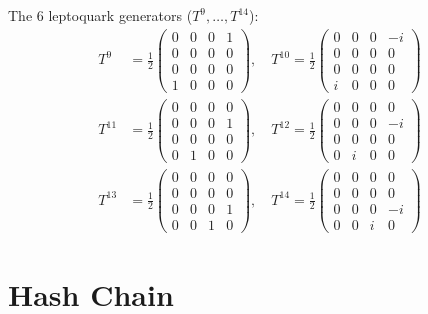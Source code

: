 \documentclass[11pt,a4paper]{article}
\theoremstyle{definition}
\begin{document}
The 6 leptoquark generators ($T^9, \ldots, T^{14}$):
\begin{align}
  \label{eq:leptoquark-9-10}
  T^9 &= \frac{1}{2}\begin{pmatrix} 0&0&0&1\\0&0&0&0\\0&0&0&0\\1&0&0&0 \end{pmatrix}, \quad
  T^{10} = \frac{1}{2}\begin{pmatrix} 0&0&0&-i\\0&0&0&0\\0&0&0&0\\i&0&0&0 \end{pmatrix} \\
  \label{eq:leptoquark-11-12}
  T^{11} &= \frac{1}{2}\begin{pmatrix} 0&0&0&0\\0&0&0&1\\0&0&0&0\\0&1&0&0 \end{pmatrix}, \quad
  T^{12} = \frac{1}{2}\begin{pmatrix} 0&0&0&0\\0&0&0&-i\\0&0&0&0\\0&i&0&0 \end{pmatrix} \\
  \label{eq:leptoquark-13-14}
  T^{13} &= \frac{1}{2}\begin{pmatrix} 0&0&0&0\\0&0&0&0\\0&0&0&1\\0&0&1&0 \end{pmatrix}, \quad
  T^{14} = \frac{1}{2}\begin{pmatrix} 0&0&0&0\\0&0&0&0\\0&0&0&-i\\0&0&i&0 \end{pmatrix}
\end{align}

\newpage

\section{Hash Chain}
\label{app:hash-chain}
\end{document}
